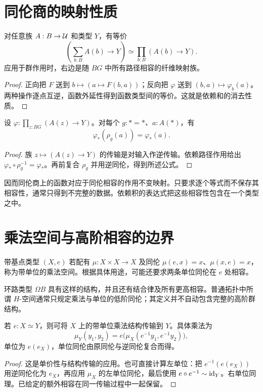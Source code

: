 \section{同伦商的映射性质}
\begin{theorem}[总空间的映射性质]
对任意族 $A:B\to\mathcal U$ 和类型 $Y$，有等价
\[
\left(\sum_{b:B}A(b)\to Y\right)
\simeq
\prod_{b:B}(A(b)\to Y).
\]
应用于群作用时，右边是随 $BG$ 中所有路径相容的纤维映射族。
\end{theorem}
\begin{proof}
正向把 $F$ 送到 $b\mapsto(a\mapsto F(b,a))$；反向把 $\varphi$ 送到 $(b,a)\mapsto\varphi_b(a)$。两种操作逐点互逆，函数外延性得到函数类型间的等价。这就是依赖和的消去性质。
\end{proof}
\begin{proposition}[基点处的相容公式]
设 $\varphi:\prod_{z:BG}(A(z)\to Y)$。对每个 $g:*=*$、$a:A(*)$，有
\[
\varphi_*(\rho_g(a))=\varphi_*(a).
\]
\end{proposition}
\begin{proof}
族 $z\mapsto(A(z)\to Y)$ 的传输是对输入作逆传输。依赖路径作用给出 $\varphi_*\circ\rho_g^{-1}=\varphi_*$。再前复合 $\rho_g$ 并用逆同伦，得到所述公式。
\end{proof}
\begin{remark}
因而同伦商上的函数对应于同伦相容的作用不变映射。只要求逐个等式而不保存其相容性，通常只得到不完整的数据。依赖积的表达式把这些相容性包含在一个类型之中。
\end{remark}

\section{乘法空间与高阶相容的边界}
\begin{definition}[带单位的乘法空间]
带基点类型 $(X,e)$ 若配有 $\mu:X\times X\to X$ 及同伦 $\mu(e,x)=x$、$\mu(x,e)=x$，称为带单位的乘法空间。根据具体用途，可能还要求两条单位同伦在 $e$ 处相容。
\end{definition}
\begin{example}
环路类型 $\Omega B$ 具有这样的结构，并且还有结合律及所有更高相容。普通拓扑中所谓 $H$-空间通常只规定乘法与单位的低阶同伦；其定义并不自动包含完整的高阶群结构。
\end{example}
\begin{proposition}[乘法空间结构的等价不变性]
若 $e:X\simeq Y$，则可将 $X$ 上的带单位乘法结构传输到 $Y$。具体乘法为
\[
\mu_Y(y_1,y_2)=e\bigl(\mu_X(e^{-1}y_1,e^{-1}y_2)\bigr),
\]
单位为 $e(e_X)$，单位同伦由原同伦与逆同伦复合而得。
\end{proposition}
\begin{proof}
这是单价性与结构传输的应用。也可直接计算左单位：把 $e^{-1}(e(e_X))$ 用逆同伦化为 $e_X$，再应用 $\mu_X$ 的左单位同伦，最后使用 $e\circ e^{-1}\sim\operatorname{id}_Y$。右单位同理。已给定的额外相容在同一传输过程中一起保留。
\end{proof}
